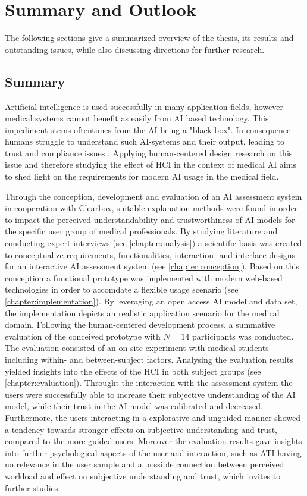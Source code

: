 \documentclass[11pt,a4paper,english]{scrreprt}
\begin{document}
\newpage
\chapter{Summary and Outlook}
The following sections give a summarized overview of the thesis, its results and outstanding issues, while also discussing directions for further research.

\section{Summary}
Artificial intelligence is used successfully in many application fields, however medical systems cannot benefit as easily from AI based technology. This impediment stems oftentimes from the AI being a "black box". In consequence humans struggle to understand such AI-systems and their output, leading to trust and compliance issues \parencite{eu_com_ai,adadi_blackbox_2018}. Applying human-centered design research on this issue and therefore studying the effect of HCI in the context of medical AI aims to shed light on the requirements for modern AI usage in the medical field.

Through the conception, development and evaluation of an AI assessment system in cooperation with Clearbox, suitable explanation methods were found in order to impact the perceived understandability and trustworthiness of AI models for the specific user group of medical professionals. By studying literature and conducting expert interviews (see \autoref{chapter:analysis}) a scientific basis was created to conceptualize requirements, functionalities, interaction- and interface designs for an interactive AI assessment system (see \autoref{chapter:conception}). Based on this conception a functional prototype was implemented with modern web-based technologies in order to accomdate a flexible usage scenario (see \autoref{chapter:implementation}). By leveraging an open access AI model and data set, the implementation depicts an realistic application scenario for the medical domain. Following the human-centered development process, a summative evaluation of the conceived prototype with $\textit{N}=14$ participants was conducted. The evaluation consisted of an on-site experiment with medical students including within- and between-subject factors. Analysing the evaluation results yielded insights into the effects of the HCI in both subject groups (see \autoref{chapter:evaluation}). Throught the interaction with the assessment system the users were successfully able to increase their subjective understanding of the AI model, while their trust in the AI model was calibrated and decreased. Furthermore, the users interacting in a explorative and unguided manner showed a tendency towards stronger effects on subjective understanding and trust, compared to the more guided users. Moreover the evaluation results gave insights into further psychological aspects of the user and interaction, such as ATI having no relevance in the user sample and a possible connection between perceived workload and effect on subjective understanding and trust, which invites to further studies.
\end{document}
